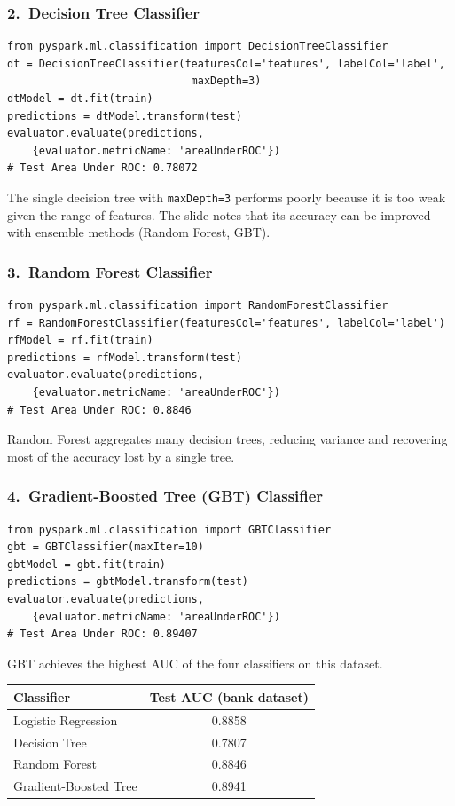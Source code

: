 \documentclass[11pt]{article}
\begin{document}
\subsubsection*{2.\ Decision Tree Classifier}
\begin{verbatim}
from pyspark.ml.classification import DecisionTreeClassifier
dt = DecisionTreeClassifier(featuresCol='features', labelCol='label',
                             maxDepth=3)
dtModel = dt.fit(train)
predictions = dtModel.transform(test)
evaluator.evaluate(predictions,
    {evaluator.metricName: 'areaUnderROC'})
# Test Area Under ROC: 0.78072
\end{verbatim}
The single decision tree with \texttt{maxDepth=3} performs poorly because it is too weak given the range of features. The slide notes that its accuracy can be improved with ensemble methods (Random Forest, GBT).

\subsubsection*{3.\ Random Forest Classifier}
\begin{verbatim}
from pyspark.ml.classification import RandomForestClassifier
rf = RandomForestClassifier(featuresCol='features', labelCol='label')
rfModel = rf.fit(train)
predictions = rfModel.transform(test)
evaluator.evaluate(predictions,
    {evaluator.metricName: 'areaUnderROC'})
# Test Area Under ROC: 0.8846
\end{verbatim}
Random Forest aggregates many decision trees, reducing variance and recovering most of the accuracy lost by a single tree.

\subsubsection*{4.\ Gradient-Boosted Tree (GBT) Classifier}
\begin{verbatim}
from pyspark.ml.classification import GBTClassifier
gbt = GBTClassifier(maxIter=10)
gbtModel = gbt.fit(train)
predictions = gbtModel.transform(test)
evaluator.evaluate(predictions,
    {evaluator.metricName: 'areaUnderROC'})
# Test Area Under ROC: 0.89407
\end{verbatim}
GBT achieves the highest AUC of the four classifiers on this dataset.

\begin{center}
\begin{tabular}{lc}
\toprule
Classifier & Test AUC (bank dataset) \\
\midrule
Logistic Regression    & 0.8858 \\
Decision Tree          & 0.7807 \\
Random Forest          & 0.8846 \\
Gradient-Boosted Tree  & 0.8941 \\
\bottomrule
\end{tabular}
\end{center}
\end{document}
